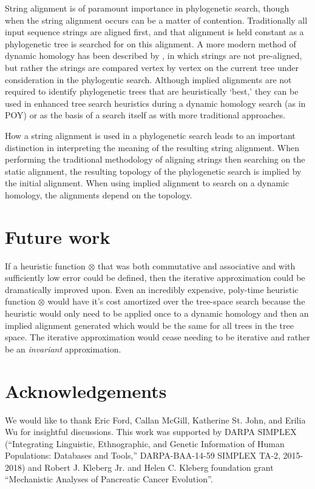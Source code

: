 \documentclass[11pt]{article}
\begin{document}
String alignment is of paramount importance in phylogenetic search, though when the string alignment occurs can be a matter of contention.
Traditionally all input sequence strings are aligned first, and that alignment is held constant as a phylogenetic tree is searched for on this alignment.
A more modern method of dynamic homology has been described by \citep{Wheeler1996}, in which strings are not pre-aligned, but rather the strings are compared vertex by vertex on the current tree under consideration in the phylogentic search.
Although implied alignments are not required to identify phylogenetic trees that are heuristically `best,' they can be used in enhanced tree search heuristics during a dynamic homology search (as in POY) or as the basis of a search itself as with more traditional approaches.

How a string alignment is used in a phylogenetic search leads to an important distinction in interpreting the meaning of the resulting string alignment.
When performing the traditional methodology of aligning strings then searching on the static alignment, the resulting topology of the phylogenetic search is implied by the initial alignment.
When using implied alignment to search on a dynamic homology, the alignments depend on the topology.


\section{Future work}
If a heuristic function $\otimes$ that was both commutative and associative and with sufficiently low error could be defined, then the iterative approximation \citep{Wheeler2003a} could be dramatically improved upon. 
Even an incredibly expensive, poly-time heuristic function $\otimes$ would have it's cost amortized over the tree-space search because the heuristic would only need to be applied once to a dynamic homology and then an implied alignment generated which would be the same for all trees in the tree space. 
The iterative approximation would cease needing to be iterative and rather be an \emph{invariant} approximation.

\section{Acknowledgements}
We would like to thank Eric Ford, Callan McGill, Katherine St. John, and Erilia Wu for insightful discussions. This work was supported by DARPA SIMPLEX (``Integrating Linguistic, Ethnographic, and Genetic Information of Human Populations: Databases and Tools,'' DARPA-BAA-14-59 SIMPLEX TA-2, 2015-2018)
 and Robert J. Kleberg Jr. and Helen C. Kleberg foundation grant ``Mechanistic Analyses of Pancreatic Cancer Evolution''.
\end{document}
